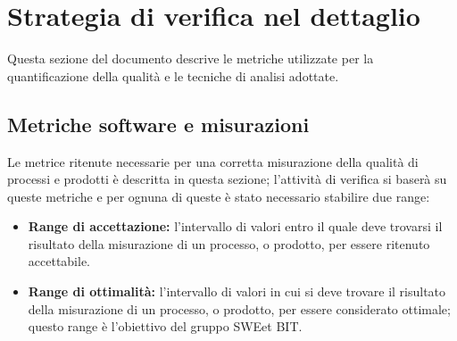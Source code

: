 \section{Strategia di verifica nel dettaglio}
  Questa sezione del documento descrive le metriche utilizzate per la quantificazione della qualità e le tecniche di analisi adottate.

  \subsection{Metriche software e misurazioni}
  Le metrice ritenute necessarie per una corretta misurazione della qualità di processi e prodotti è descritta in questa sezione;
  l'attività di verifica si baserà su queste metriche e per ognuna di queste è stato necessario stabilire due range:
  \begin{itemize}
    \item \textbf{Range di accettazione:} l'intervallo di valori entro il quale deve trovarsi il risultato della misurazione di un processo, o prodotto, per essere ritenuto accettabile.
    \item \textbf{Range di ottimalità:} l'intervallo di valori in cui si deve trovare il risultato della misurazione di un processo, o prodotto, per essere considerato ottimale;
    questo range è l'obiettivo del gruppo SWEet BIT.
  \end{itemize}
